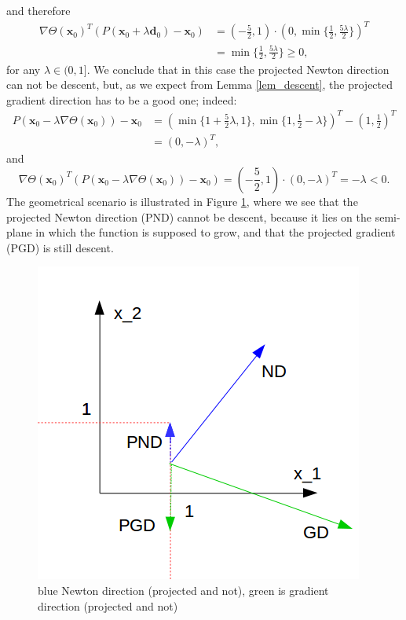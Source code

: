 and therefore
\begin{eqnarray*}
	\nabla \Theta (\textbf{x}_0)^T (P (\textbf{x}_0 +\lambda \textbf{d}_0) - \textbf{x}_0) &= \left(-\frac{5}{2}, 1\right) \cdot \left(0, \min \{\frac{1}{2}, \frac{5\lambda}{2}\}\right)^T\\
	&= \min\{ \frac{1}{2}, \frac{5 \lambda}{2} \} \geq 0,
\end{eqnarray*}
for any $ \lambda \in (0,1] $. We conclude that in this case the projected Newton direction can not be descent, but, as we expect from Lemma \ref{lem_descent}, the projected gradient direction has to be a good one; indeed:
\begin{eqnarray*}
	P (\textbf{x}_0 -\lambda \nabla \Theta (\textbf{x}_0)) - \textbf{x}_0 &= \left( \min\{1+\frac{5}{2}\lambda, 1 \},\min \{1, \frac{1}{2} - \lambda\} \right)^T - \left(1, \frac{1}{2}\right)^T \\
	&=\left(0,-\lambda \right)^T,
\end{eqnarray*}
and
\begin{equation*}
\nabla \Theta (\textbf{x}_0)^T (P (\textbf{x}_0 -\lambda \nabla \Theta (\textbf{x}_0)) - \textbf{x}_0) = \left(-\frac{5}{2}, 1\right) \cdot \left(0,-\lambda \right)^T = - \lambda < 0.
\end{equation*}
The geometrical scenario is illustrated in Figure \ref{esempio7}, where we see that the projected Newton direction (PND) cannot be descent, because it lies on the semi-plane in which the function is supposed to grow, and that the projected gradient (PGD) is still descent. 
\begin{figure}[h]
	\centering
	\includegraphics[width=0.7\linewidth]{example7}
	\caption[newton and gradient direction]{blue Newton direction (projected and not), green is gradient direction (projected and not)}
	\label{esempio7}
\end{figure}

